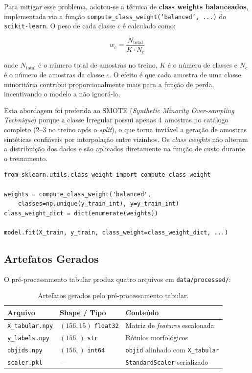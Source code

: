 \documentclass[12pt, a4paper]{article}
\begin{document}
Para mitigar esse problema, adotou-se a técnica de \textbf{class weights
balanceados}, implementada via a função
\texttt{compute\_class\_weight('balanced', ...)} do \texttt{scikit-learn}.
O peso de cada classe $c$ é calculado como:

\begin{equation}
  w_c = \frac{N_\text{total}}{K \cdot N_c}
\end{equation}

onde $N_\text{total}$ é o número total de amostras no treino, $K$ é o número
de classes e $N_c$ é o número de amostras da classe $c$. O efeito é que cada
amostra de uma classe minoritária contribui proporcionalmente mais para a
função de perda, incentivando o modelo a não ignorá-la.

Esta abordagem foi preferida ao SMOTE (\textit{Synthetic Minority
Over-sampling Technique}) \cite{chawla2002} porque a classe Irregular
possui apenas 4~amostras no catálogo completo (2--3 no treino após o
\textit{split}), o que torna inviável a geração de amostras sintéticas
confiáveis por interpolação entre vizinhos. Os \textit{class weights}
não alteram a distribuição dos dados e são aplicados diretamente na função
de custo durante o treinamento.

\begin{lstlisting}[caption={Cálculo e aplicação dos \textit{class weights}.}, label=lst:classweight]
from sklearn.utils.class_weight import compute_class_weight

weights = compute_class_weight('balanced',
    classes=np.unique(y_train_int), y=y_train_int)
class_weight_dict = dict(enumerate(weights))

model.fit(X_train, y_train, class_weight=class_weight_dict, ...)
\end{lstlisting}

\subsection{Artefatos Gerados}

O pré-processamento tabular produz quatro arquivos em \texttt{data/processed/}:

\begin{table}[H]
  \centering
  \caption{Artefatos gerados pelo pré-processamento tabular.}
  \begin{tabular}{llp{7cm}}
    \toprule
    \textbf{Arquivo} & \textbf{Shape / Tipo} & \textbf{Conteúdo} \\
    \midrule
    \texttt{X\_tabular.npy} & $(156, 15)$ \texttt{float32} & Matriz de \textit{features} escalonada \\
    \texttt{y\_labels.npy}  & $(156,)$ \texttt{str} & Rótulos morfológicos \\
    \texttt{objids.npy}     & $(156,)$ \texttt{int64} & \texttt{objid} alinhado com \texttt{X\_tabular} \\
    \texttt{scaler.pkl}     & --- & \texttt{StandardScaler} serializado \\
    \bottomrule
  \end{tabular}
\end{table}
\end{document}
